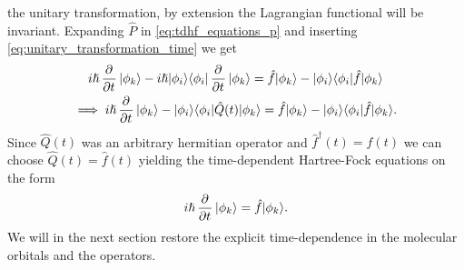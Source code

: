         the unitary transformation, by extension the Lagrangian functional will
        be invariant. Expanding $\hat{P}$ in
        \autoref{eq:tdhf_equations_p} and inserting
        \autoref{eq:unitary_transformation_time} we get
        \begin{gather}
            i\hslash\dpd{}{t}\ket{\phi_k}
            - i\hslash\ket{\phi_i}\bra{\phi_i}\dpd{}{t}\ket{\phi_k}
            = \hat{f}\ket{\phi_k}
            - \ket{\phi_i}\bra{\phi_i}\hat{f}\ket{\phi_k}
            \\
            \implies
            i\hslash\dpd{}{t}\ket{\phi_k}
            - \ket{\phi_i}\bra{\phi_i}\hat{Q}(t)\ket{\phi_k}
            = \hat{f}\ket{\phi_k}
            - \ket{\phi_i}\bra{\phi_i}\hat{f}\ket{\phi_k}.
        \end{gather}
        Since $\hat{Q}(t)$ was an arbitrary hermitian operator and
        $\hat{f}^{\dagger}(t) = \hat{f}(t)$ we can choose $\hat{Q}(t) =
        \hat{f}(t)$ yielding the time-dependent Hartree-Fock equations on the
        form
        \begin{align}
            i\hslash\dpd{}{t}\ket{\phi_k}
            = \hat{f}\ket{\phi_k}.
        \end{align}
        We will in the next section restore the explicit time-dependence in the
        molecular orbitals and the operators.

